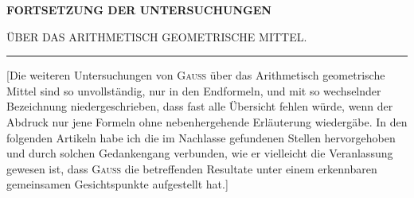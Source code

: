 \clearpage{}
\begin{center}\bfseries
FORTSETZUNG DER UNTERSUCHUNGEN

ÜBER DAS ARITHMETISCH GEOMETRISCHE MITTEL.

\rule{0.08\linewidth}{0.3pt}
\end{center}
[Die weiteren Untersuchungen von \textsc{Gauss} über das Arithmetisch geometrische Mittel sind so unvollständig, nur in den Endformeln, und mit so wechselnder Bezeichnung niedergeschrieben, dass fast alle Übersicht fehlen würde, wenn der Abdruck nur jene Formeln ohne nebenhergehende Erläuterung wiedergäbe. In den folgenden Artikeln habe ich die im Nachlasse gefundenen Stellen hervorgehoben und durch solchen Gedankengang verbunden, wie er vielleicht die Veranlassung gewesen ist, dass \textsc{Gauss} die betreffenden Resultate unter einem erkennbaren gemeinsamen Gesichtspunkte aufgestellt hat.]

